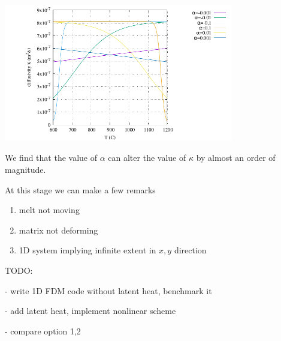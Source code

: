 \begin{center}
\includegraphics[width=10cm]{python_codes/fieldstone_169/images/kappa.pdf}
\end{center}
We find that the value of $\alpha$ can alter the value of $\kappa$ by almost an order of magnitude.

At this stage we can make a few remarks
\begin{enumerate}
\item melt not moving
\item matrix not deforming
\item 1D system implying infinite extent in $x,y$ direction
\end{enumerate}


TODO:

- write 1D FDM code without latent heat, benchmark it

- add latent heat, implement nonlinear scheme

- compare option 1,2













